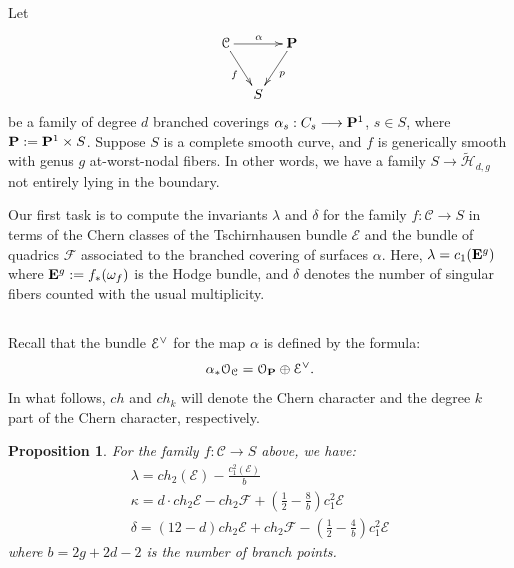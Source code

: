 \documentclass[reqno, 10 pt]{article}
\newtheorem{prop}[thm]{Proposition}
\theoremstyle{definition}
\theoremstyle{remark}
\numberwithin{equation}{section}
\numberwithin{thm}{section}
\numberwithin{prop}{section}
\numberwithin{lem}{section}
\numberwithin{cor}{section}
\numberwithin{conj}{section}
\numberwithin{defn}{section}
\renewcommand{\H}{\mathcal H}
\newcommand{\td}{\widetilde}
\renewcommand{\to}{\longrightarrow}
\newcommand{\cC}{{\mathcal C}}
\newcommand{\cE}{{\mathcal E}}
\newcommand{\cF}{{\mathcal F}}
\newcommand{\cO}{{\mathcal O}}
\newcommand {\E}{{\bf E}}
\renewcommand{\P}{{\bf P}}
\newcommand {\from}{{\colon}}
\renewcommand{\H}{{\mathcal{H}}}
\begin{document}
Let 
 \begin{equation} \nonumber
\xymatrix @C -1.1pc  {
\cC \ar[rr]^{\alpha} \ar[rd]_f&&
\P \ar[ld]^p \\
& S}
 \end{equation} 
be a family of degree $d$ branched coverings $\alpha_{s} : C_{s} \to \P^{1}$, $s \in S$, where $\P := \P^{1} \times S$.  Suppose $S$ is a complete smooth curve,  and $f$ is generically smooth  with genus $g$ at-worst-nodal fibers. In other words, we have a family $S \to \td \H_{d,g}$ not entirely lying in the boundary.


Our first task is to compute the invariants $\lambda$ and $\delta$ for the family $f \from \cC \to S$ in terms of the Chern classes of the Tschirnhausen bundle $\cE$ and the  bundle of quadrics $\cF$ associated to the branched covering of surfaces $\alpha$. Here, $\lambda = c_{1}(\E^{g})$ where $\E^{g} := f_{*}(\omega_{f})$ is the Hodge bundle, and $\delta$ denotes the number of singular fibers counted with the usual multiplicity.

\subsection{}
 Recall that the bundle $\dual{\cE}$ for the map $\alpha$ is defined by the formula:
\begin{equation}\label{Edirectsum}
\alpha_{*}\cO_{\cC} = \cO_{\P} \oplus \dual{\cE}.
\end{equation} In what follows, $ch$ and $ch_{k}$ will denote the Chern character and the degree $k$ part of the Chern character, respectively.


\begin{prop}\label{lambda:covers} For the family $f \from \cC \to S$ above, we have:
\begin{align}
&\lambda = ch_2(\cE) - \frac{c_{1}^{2}(\cE)}{b}& \label{lambdaexpression}\\ 
&\kappa 
= d \cdot ch_{2}\cE - ch_{2}\cF + \left(\frac{1}{2} - \frac{8}{b}\right)c_{1}^{2}\cE& \label{kappaexpression}\\
&\delta = (12-d)ch_{2}\cE + ch_{2}\cF  -\left(\frac{1}{2} -  \frac{4}{b}\right)c_{1}^{2}\cE&
\end{align}
where $b = 2g+2d-2$ is the number of branch points.
\end{prop}
\end{document}
